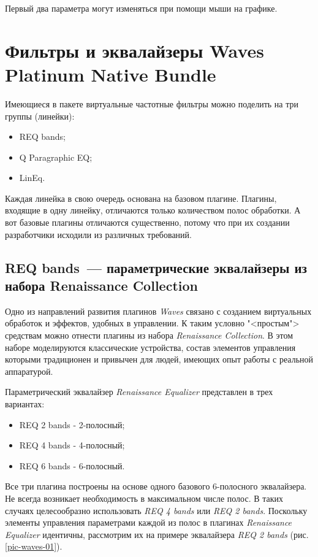 \documentclass[oneside, final, 14pt]{extreport}
\begin{document}
Первый два параметра могут изменяться при помощи мыши на графике.

\section{Фильтры и эквалайзеры Waves Platinum Native Bundle}
Имеющиеся в пакете виртуальные частотные фильтры можно поделить на три группы (линейки):
\begin{itemize}
  \item REQ bands;
  \item Q Paragraphic EQ;
  \item LinEq.
\end{itemize}

Каждая линейка в свою очередь основана на базовом плагине. Плагины, входящие в одну линейку, отличаются только количеством полос обработки. А вот базовые плагины отличаются существенно, потому что при их создании разработчики исходили из различных требований.

\subsection{REQ bands~--- параметрические эквалайзеры из набора Renaissance Collection}

Одно из направлений развития плагинов \emph{Waves} связано с созданием виртуальных обработок и эффектов, удобных в управлении. К таким условно "<простым"> средствам можно отнести плагины из набора \emph{Renaissance Collection}. В этом наборе моделируются классические устройства, состав элементов управления которыми традиционен и привычен для людей, имеющих опыт работы с реальной аппаратурой.

Параметрический эквалайзер \emph{Renaissance Equalizer} представлен в трех вариантах:
\begin{itemize}
  \item REQ 2 bands - 2-полосный;
  \item REQ 4 bands - 4-полосный;
  \item REQ 6 bands - 6-полосный.
\end{itemize}

Все три плагина построены на основе одного базового 6-полосного эквалайзера. Не всегда возникает необходимость в максимальном числе полос. В таких случаях целесообразно использовать \emph{REQ 4 bands} или \emph{REQ 2 bands}. Поскольку элементы управления параметрами каждой из полос в плагинах \emph{Renaissance Equalizer} идентичны, рассмотрим их на примере эквалайзера \emph{REQ 2 bands} (рис. \ref{pic-waves-01}).
\end{document}
